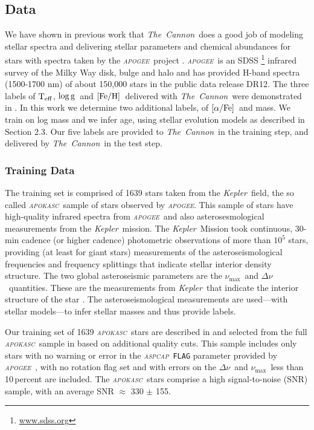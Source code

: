 \documentclass[12pt, preprint]{aastex}
\newcommand{\project}[1]{\textsl{#1}}
\newcommand{\tc}{\project{The~Cannon}}
\newcommand{\apogee}{\project{\textsc{apogee}}}
\newcommand{\apokasc}{\project{\textsc{apokasc}}}
\newcommand{\aspcap}{\project{\textsc{aspcap}}}
\newcommand{\kepler}{\project{Kepler}}
\newcommand{\code}[1]{\texttt{#1}}
\newcommand{\teff}{\mbox{$\rm T_{eff}$}}
\newcommand{\feh}{\mbox{$\rm [Fe/H]$}}
\newcommand{\alphafe}{\mbox{$\rm [\alpha/Fe]$}}
\newcommand{\logg}{\mbox{$\rm \log g$}}
\newcommand{\numax}{$\nu_{\max}$}
\newcommand{\deltanu}{$\Delta\nu$}
\begin{document}
\subsection{Data}

We have shown in previous work \citep{Ness2015} that \tc\ does a good job
of modeling stellar spectra and delivering stellar parameters and
chemical abundances for stars with spectra taken by the \apogee\ project \citep{Majewski2012}.  \apogee\ is an SDSS \footnote{\url{www.sdss.org}}  \citep{E2011} infrared survey of the Milky Way disk, bulge and halo and has provided H-band spectra (1500-1700 nm) of about 150,000 stars in the public data release DR12.  
The three labels of \teff, \logg\ and \feh\ delivered with \tc\ were demonstrated in \citet{Ness2015}.  In this work we determine two additional labels, of \alphafe\ and mass. We train on log mass and we infer age, using stellar evolution models as described in Section 2.3. Our five labels are provided to \tc\ in the training step, and delivered by \tc\ in the test step.

\subsubsection{Training Data} 


 The training set is comprised of 1639 stars taken from the \kepler\ field, the so called \apokasc\ sample \citep{P2014}  of stars observed by \apogee.
This sample of stars have high-quality infrared
spectra from \apogee\ and also asterosesmological measurements from the \kepler\ mission.
The \kepler\ Mission \citep{B2010} took continuous, 30-min cadence (or
higher cadence) photometric observations of more than $10^5$ stars,
providing (at least for giant stars) measurements of the
asteroseismological frequencies and frequency splittings that indicate
stellar interior density structure.
The two global asteroseismic parameters are the \numax\ and \deltanu\ quantities. These are the measurements from \kepler\ that indicate the interior structure of the star \citep[see][and references therein]{P2014}.
The asteroseismological measurements are used---with stellar models---to infer stellar masses and thus provide labels.

Our training set of 1639 \apokasc\ stars are described in \citet{Martig2014} and selected from the full \apokasc\ sample in \citet{P2014} based on additional quality cuts. This sample includes only stars with no warning or error in the \aspcap\ \code{FLAG} parameter provided by \apogee\ \citep{Ahn2014}, with no rotation flag set and with errors on the \deltanu\ and \numax\ less than 10\,percent are included. The \apokasc\ stars comprise a high signal-to-noise (SNR) sample, with an average SNR $\approx$ 330 $\pm$ 155. 
\end{document}

